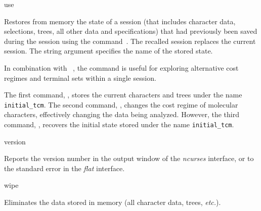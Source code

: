 \begin{command}{use}{}

	\syntax{\obligatory{(\poystring)}}

	\begin{poydescription}
         Restores from memory the state of a \poy session (that includes character data,
         selections, trees, all other data and specifications) that had previously been
         saved during the session using the command~. The recalled
         session replaces the current session. The string argument specifies the name
         of the stored state.
         
         In combination with ~, the command 
         is useful for exploring alternative  cost regimes and terminal sets
         within a single \poy session.
            
	\end{poydescription}
	
	\begin{poyexamples}
            {The first command, , stores the current
            characters and trees under the
            name \texttt{initial\_tcm}. The second command,
            , changes the cost regime of molecular characters,
            effectively changing the data being analyzed. However, the third
            command, , recovers the initial state stored under the
            name \texttt{initial\_tcm}.}
    \end{poyexamples}

     \begin{poyalso}
    \end{poyalso}

\end{command}

   
\begin{command}{version}{}

	\syntax{\obligatory{()}}

	\begin{poydescription}
            Reports the \poy version number in the output window of the \emph{ncurses}
            interface, or to the standard error in the \emph{flat} interface.
	\end{poydescription}

    \begin{poyexamples}
    \end{poyexamples}
\end{command}

   
\begin{command}{wipe}{}

	\syntax{\obligatory{()}}

	\begin{poydescription}
        Eliminates the data stored in memory (all character data, trees, \emph{etc.}).
	\end{poydescription}

    \begin{poyexamples}
    \end{poyexamples}
\end{command}
      
